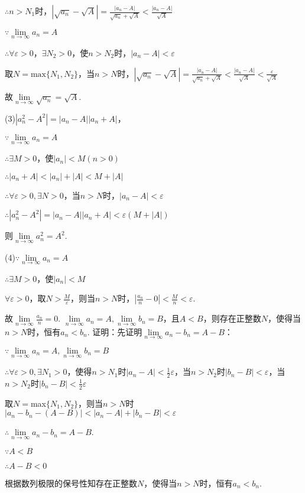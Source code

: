 \documentclass[12pt,UTF8]{ctexart}
\begin{document}
\begin{enumerate}
$\therefore n>N_1$时，$|\sqrt{a_n}-\sqrt A|=\frac{|a_n-A|}{\sqrt{a_n}+\sqrt A}<\frac{|a_n-A|}{\sqrt A}$

$\because\lim\limits_{n\rightarrow\infty}a_n=A$

$\therefore\forall\varepsilon>0$，$\exists N_2>0$，使$n>N_2$时，$|a_n-A|<\varepsilon$

取$N=\text{max}\{N_1,N_2\}$，当$n>N$时，$|\sqrt{a_n}-\sqrt A|=\frac{|a_n-A|}{\sqrt{a_n}+\sqrt A}<\frac{|a_n-A|}{\sqrt A}<\frac{\varepsilon}{\sqrt A}$

故$\lim\limits_{n\rightarrow\infty}\sqrt{a_n}=\sqrt{A}$.


(3)$|a_n^2-A^2|=|a_n-A||a_n+A|$，

$\because\lim\limits_{n\rightarrow\infty}a_n=A$

$\therefore\exists M>0$，使$|a_n|<M(n>0)$

$\therefore|a_n+A|<|a_n|+|A|<M+|A|$

$\therefore\forall\varepsilon>0,\exists N>0$，当$n>N$时，$|a_n-A|<\varepsilon$

$\therefore|a_n^2-A^2|=|a_n-A||a_n+A|<\varepsilon(M+|A|)$

则$\lim\limits_{n\rightarrow\infty}a_n^2=A^2$.

(4)$\because\lim\limits_{n\rightarrow\infty}a_n=A$

$\therefore\exists M>0$，使$|a_n|<M$

$\forall\varepsilon>0$，取$N>\frac M\varepsilon$，则当$n>N$时，$|\frac{a_n}n-0|<\frac Mn<\varepsilon$.

故$\lim\limits_{n\rightarrow\infty}\frac{a_n}n=0$.
$\lim\limits_{n\rightarrow\infty}a_n=A,\lim\limits_{n\rightarrow\infty}b_n=B$，且$A<B$，则存在正整数$N$，使得当$n>N$时，恒有$a_n<b_n$.
\newline
证明：先证明$\lim\limits_{n\rightarrow\infty}a_n-b_n=A-B$：

$\because\lim\limits_{n\rightarrow\infty}a_n=A,\lim\limits_{n\rightarrow\infty}b_n=B$

$\therefore\forall\varepsilon>0,\exists N_1>0$，使得$n>N_1$时$|a_n-A|<\frac12\varepsilon$，当$n>N_2$时$|b_n-B|<\varepsilon$，当$n>N_2$时$|b_n-B|<\frac12\varepsilon$

取$N=$max$\{N_1,N_2\}$，则当$n>N$时$|a_n-b_n-(A-B)|<|a_n-A|+|b_n-B|<\varepsilon$

$\therefore\lim\limits_{n\rightarrow\infty}a_n-b_n=A-B$.

$\because A<B$

$\therefore A-B<0$

根据数列极限的保号性知存在正整数$N$，使得当$n>N$时，恒有$a_n<b_n$.
\end{enumerate}
\end{document}

